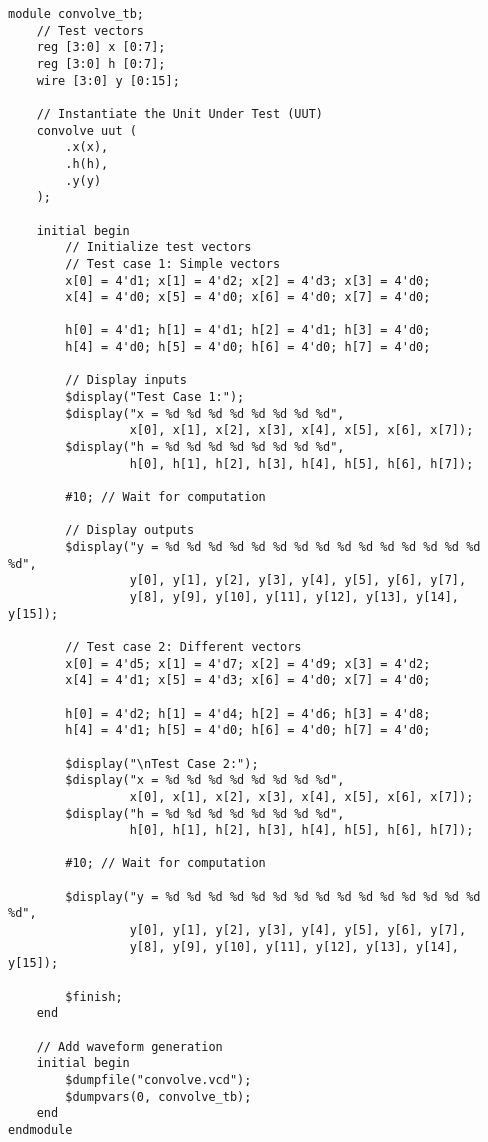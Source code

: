 \documentclass{article}
\begin{document}
\begin{lstlisting}
module convolve_tb;
    // Test vectors
    reg [3:0] x [0:7];
    reg [3:0] h [0:7];
    wire [3:0] y [0:15];
    
    // Instantiate the Unit Under Test (UUT)
    convolve uut (
        .x(x),
        .h(h),
        .y(y)
    );
    
    initial begin
        // Initialize test vectors
        // Test case 1: Simple vectors
        x[0] = 4'd1; x[1] = 4'd2; x[2] = 4'd3; x[3] = 4'd0;
        x[4] = 4'd0; x[5] = 4'd0; x[6] = 4'd0; x[7] = 4'd0;
        
        h[0] = 4'd1; h[1] = 4'd1; h[2] = 4'd1; h[3] = 4'd0;
        h[4] = 4'd0; h[5] = 4'd0; h[6] = 4'd0; h[7] = 4'd0;
        
        // Display inputs
        $display("Test Case 1:");
        $display("x = %d %d %d %d %d %d %d %d", 
                 x[0], x[1], x[2], x[3], x[4], x[5], x[6], x[7]);
        $display("h = %d %d %d %d %d %d %d %d", 
                 h[0], h[1], h[2], h[3], h[4], h[5], h[6], h[7]);
        
        #10; // Wait for computation
        
        // Display outputs
        $display("y = %d %d %d %d %d %d %d %d %d %d %d %d %d %d %d %d", 
                 y[0], y[1], y[2], y[3], y[4], y[5], y[6], y[7],
                 y[8], y[9], y[10], y[11], y[12], y[13], y[14], y[15]);
        
        // Test case 2: Different vectors
        x[0] = 4'd5; x[1] = 4'd7; x[2] = 4'd9; x[3] = 4'd2;
        x[4] = 4'd1; x[5] = 4'd3; x[6] = 4'd0; x[7] = 4'd0;
        
        h[0] = 4'd2; h[1] = 4'd4; h[2] = 4'd6; h[3] = 4'd8;
        h[4] = 4'd1; h[5] = 4'd0; h[6] = 4'd0; h[7] = 4'd0;
        
        $display("\nTest Case 2:");
        $display("x = %d %d %d %d %d %d %d %d", 
                 x[0], x[1], x[2], x[3], x[4], x[5], x[6], x[7]);
        $display("h = %d %d %d %d %d %d %d %d", 
                 h[0], h[1], h[2], h[3], h[4], h[5], h[6], h[7]);
        
        #10; // Wait for computation
        
        $display("y = %d %d %d %d %d %d %d %d %d %d %d %d %d %d %d %d", 
                 y[0], y[1], y[2], y[3], y[4], y[5], y[6], y[7],
                 y[8], y[9], y[10], y[11], y[12], y[13], y[14], y[15]);
                 
        $finish;
    end
    
    // Add waveform generation
    initial begin
        $dumpfile("convolve.vcd");
        $dumpvars(0, convolve_tb);
    end
endmodule
\end{lstlisting}
\end{document}

